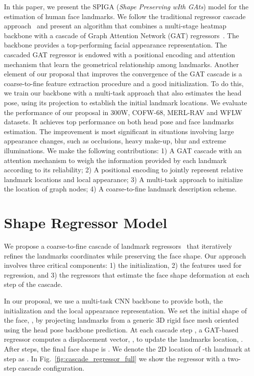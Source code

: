 \documentclass{bmvc2k}
\begin{document}
In this paper, we present the SPIGA (\emph{Shape Preserving wIth GAts}) model for the estimation of human face landmarks. We follow the traditional regressor cascade approach~\cite{Cao14} and present an algorithm that combines a multi-stage heatmap backbone with a cascade of Graph Attention Network (GAT) regressors~\cite{Velickovic18gats}. The backbone provides a top-performing facial appearance representation. The cascaded GAT regressor is endowed with a positional encoding and attention mechanism that learn the geometrical relationship among landmarks. Another element of our proposal that improves the convergence of the GAT cascade is a coarse-to-fine feature extraction procedure and a good initialization. To do this, we train our backbone with a multi-task approach that also estimates the head pose, using its projection to establish the initial landmark locations. We evaluate the performance of our proposal in 300W, COFW-68, MERL-RAV and WFLW datasets. It achieves top performance on both head pose and face landmarks estimation. The improvement is most significant in situations involving large appearance changes, such as occlusions, heavy make-up, blur and extreme illuminations. 
We make the following contributions:
1) A GAT cascade with an attention mechanism to weigh the information provided by each landmark according to its reliability;
2) A positional encoding to jointly represent relative landmark locations and local appearance;
3) A multi-task approach to initialize the location of graph nodes;
4) A coarse-to-fine landmark description scheme.



\section{Shape Regressor Model}
\label{sec:our_method}

We propose a coarse-to-fine cascade of landmark regressors~\cite{Dollar10,Cao14} that iteratively refines the landmarks coordinates while preserving the face shape. Our approach involves three critical components: 1) the initialization, 2) the features used for regression, and 3) the regressors that estimate the face shape deformation at each step of the cascade. 

In our proposal, we use a multi-task CNN backbone to provide both, the initialization and the local appearance representation. We set the initial shape of the face, ,  by projecting  landmarks from a generic 3D rigid face mesh oriented using the head pose backbone prediction. At each cascade step , a GAT-based~\cite{Velickovic18gats} regressor computes a displacement vector, , to update the landmarks location, . After  steps, the final face shape is . We denote the 2D location of -th landmark at step  as . In Fig.~\ref{fig:cascade_regressor_full} we show the regressor with a two-step cascade configuration.
\end{document}
